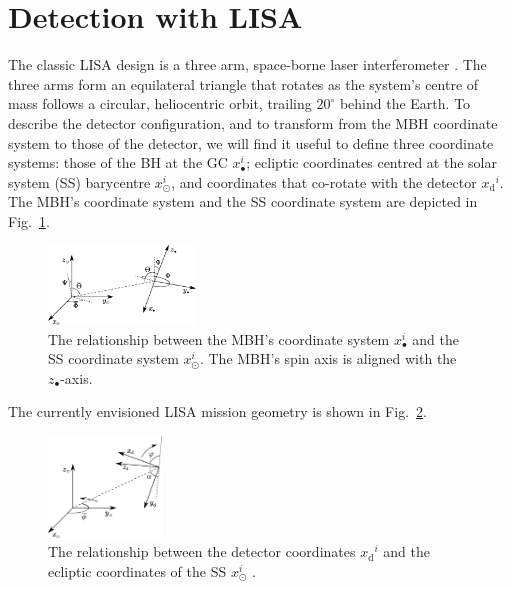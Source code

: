 \documentclass[useAMS,usedcolumn,usegraphicx,usenatbib]{mn2e}
\newcommand{\figref}[1]{Fig.~\ref{fig:#1}}
\newcommand{\sub}[1]{\ensuremath{_\mathrm{#1}}}
\begin{document}
\section{Detection with LISA}\label{sec:Detector}

The classic LISA design is a three arm, space-borne laser interferometer \citep{Bender1998, Danzmann2003}. The three arms form an equilateral triangle that rotates as the system's centre of mass follows a circular, heliocentric orbit, trailing $20^{\circ}$ behind the Earth. To describe the detector configuration, and to transform from the MBH coordinate system to those of the detector, we will find it useful to define three coordinate systems: those of the BH at the GC $x_\bullet^i$; ecliptic coordinates centred at the solar system (SS) barycentre $x_\odot^i$, and coordinates that co-rotate with the detector $x\sub{d}^i$. The MBH's coordinate system and the SS coordinate system are depicted in \figref{BH_SS}.
\begin{figure}
\begin{center}
 \includegraphics[width=0.35\textwidth]{BH_SS.eps}
    \caption{The relationship between the MBH's coordinate system $x_\bullet^i$ and the SS coordinate system $x_\odot^i$. The MBH's spin axis is aligned with the $z_\bullet$-axis.}
   \label{fig:BH_SS}
\end{center}
\end{figure}
The currently envisioned LISA mission geometry is shown in \figref{SS_LISA}.
\begin{figure}
\begin{center}
 \includegraphics[width=0.27\textwidth]{SS_LISA.eps}
    \caption{The relationship between the detector coordinates $x\sub{d}^i$ and the ecliptic coordinates of the SS $x_\odot^i$ \citep{Bender1998}.}
   \label{fig:SS_LISA}
\end{center}
\end{figure}
\end{document}
